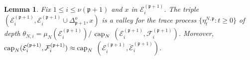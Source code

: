 \documentclass[reqno]{amsart}
\newtheorem{lemma}[theorem]{Lemma}
\begin{document}
\begin{lemma}
\label{s18}
Fix $1\le i\le \nu ({{\mathfrak p}}+1)$ and $x$ in ${{\mathcal E}}^{({{\mathfrak p}} +1)}_i$.  The
triple $({{\mathcal E}}^{({{\mathfrak p}} +1)}_i, {{\mathcal E}}^{({{\mathfrak p}} +1)}_i \cup \Delta^o_{{{\mathfrak p}}+1} ,x)$ is a valley for the trace process $\{\eta^{N,{{\mathfrak p}}}_t :
t\ge 0\}$ of depth $\theta_{N,i} = \mu_N({{\mathcal E}}^{({{\mathfrak p}} +1)}_i)/$ ${{\rm cap}}_N
$ $({{\mathcal E}}^{({{\mathfrak p}} +1)}_i , {{\mathcal F}}^{({{\mathfrak p}} +1)}_i)$. Moreover, ${{\rm cap}}_N
({{\mathcal E}}^{({{\mathfrak p}} +1)}_i , {{\mathcal F}}^{({{\mathfrak p}} +1)}_i) \approx {{\rm cap}}_N$ $({{\mathcal E}}^{({{\mathfrak p}} +1)}_i , \breve{{{\mathcal E}}}^{({{\mathfrak p}} +1)}_i)$.
\end{lemma}
\end{document}
